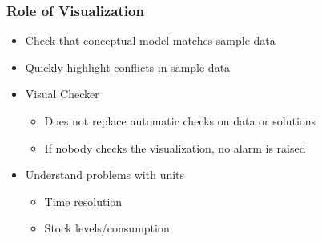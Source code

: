 %

%    



\begin{frame}
  \frametitle{Role of Visualization}
  \begin{itemize}
  \item Check that conceptual model matches sample data
  \item Quickly highlight conflicts in sample data
  \item Visual Checker
  \begin{itemize}
      \item Does not replace automatic checks on data or solutions
      \item If nobody checks the visualization, no alarm is raised
  \end{itemize}
    \item Understand problems with units
    \begin{itemize}
        \item Time resolution
        \item Stock levels/consumption
    \end{itemize}
  \end{itemize}
\end{frame}


